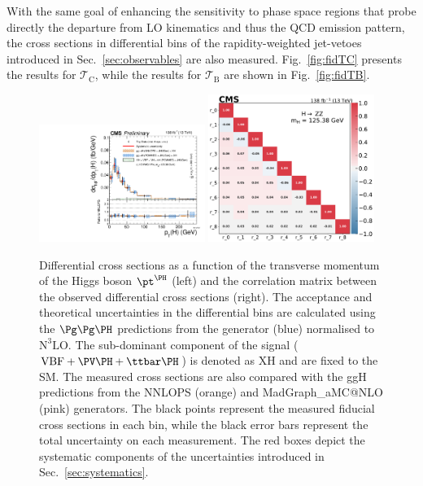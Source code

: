 With the same goal of enhancing the sensitivity to phase space regions that probe directly the departure from LO kinematics and thus the QCD emission pattern, the cross sections in differential bins of the rapidity-weighted jet-vetoes introduced in Sec.~\ref{sec:observables} are also measured. Fig.~\ref{fig:fidTC} presents the results for  $\mathcal{T}_{\text{C}}$, while the results for  $\mathcal{T}_{\text{B}}$ are shown in Fig.~\ref{fig:fidTB}.

\clearpage

\begin{center}
	\begin{figure}[!htbp]
		\centering
		\includegraphics[width=0.48\textwidth]{Images/H4L/pT4l_unfoldwith_SM_125_asimov.pdf}
		\includegraphics[width=0.48\textwidth]{Images/H4L/correlations/corr_pT4l_v3.pdf}\\
		\caption{
			Differential cross sections as a function of the transverse momentum of the Higgs boson $\pt^{\PH}$ (left) and the correlation matrix between the observed differential cross sections (right). 
			The acceptance and theoretical uncertainties in the differential bins are calculated using the $\ggH$ predictions from the \POWHEG generator (blue) normalised to $\mathrm{N^3LO}$.
			The sub-dominant component of the signal ($\VBF + \VH + \ttH$) is denoted as XH and are fixed to the SM.
			The measured cross sections are also compared with the ggH predictions from the NNLOPS (orange) and MadGraph\_aMC@NLO (pink) generators.
			The black points represent the measured fiducial cross sections in each bin, while the black error bars represent the total uncertainty on each measurement.
			The red boxes depict the systematic components of the uncertainties introduced in Sec.~\ref{sec:systematics}.
			\label{fig:fidPTH}}
	\end{figure}
\end{center}

